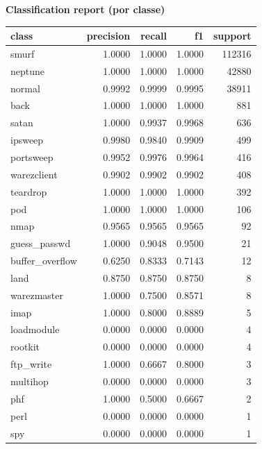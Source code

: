 \documentclass[11pt]{article}
\begin{document}
\begin{center}
\textbf{Classification report (por classe)}\par
\begin{longtable}{lrrrr}
\toprule
class & precision & recall & f1 & support \\
\midrule
smurf & 1.0000 & 1.0000 & 1.0000 & 112316 \\
neptune & 1.0000 & 1.0000 & 1.0000 & 42880 \\
normal & 0.9992 & 0.9999 & 0.9995 & 38911 \\
back & 1.0000 & 1.0000 & 1.0000 & 881 \\
satan & 1.0000 & 0.9937 & 0.9968 & 636 \\
ipsweep & 0.9980 & 0.9840 & 0.9909 & 499 \\
portsweep & 0.9952 & 0.9976 & 0.9964 & 416 \\
warezclient & 0.9902 & 0.9902 & 0.9902 & 408 \\
teardrop & 1.0000 & 1.0000 & 1.0000 & 392 \\
pod & 1.0000 & 1.0000 & 1.0000 & 106 \\
nmap & 0.9565 & 0.9565 & 0.9565 & 92 \\
guess\_passwd & 1.0000 & 0.9048 & 0.9500 & 21 \\
buffer\_overflow & 0.6250 & 0.8333 & 0.7143 & 12 \\
land & 0.8750 & 0.8750 & 0.8750 & 8 \\
warezmaster & 1.0000 & 0.7500 & 0.8571 & 8 \\
imap & 1.0000 & 0.8000 & 0.8889 & 5 \\
loadmodule & 0.0000 & 0.0000 & 0.0000 & 4 \\
rootkit & 0.0000 & 0.0000 & 0.0000 & 4 \\
ftp\_write & 1.0000 & 0.6667 & 0.8000 & 3 \\
multihop & 0.0000 & 0.0000 & 0.0000 & 3 \\
phf & 1.0000 & 0.5000 & 0.6667 & 2 \\
perl & 0.0000 & 0.0000 & 0.0000 & 1 \\
spy & 0.0000 & 0.0000 & 0.0000 & 1 \\
\bottomrule
\end{longtable}
\end{center}
\end{document}
